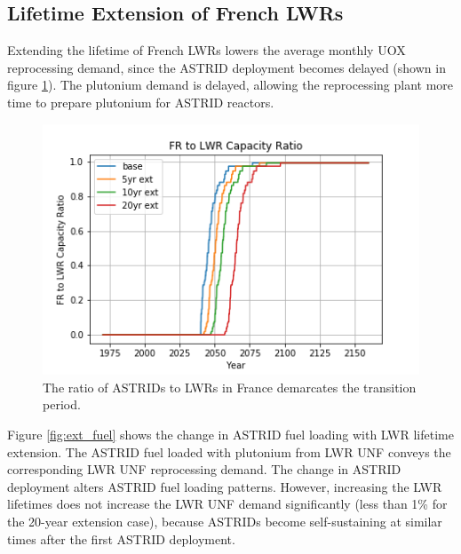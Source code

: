 \subsection{Lifetime Extension of French \glspl{LWR}}\label{sec:life}
Extending the lifetime of French \glspl{LWR} lowers the average
monthly \gls{UOX} reprocessing demand, since the \gls{ASTRID} deployment becomes 
delayed (shown in figure \ref{fig:pow_diff}). The plutonium demand is delayed,
 allowing the reprocessing plant more time to prepare plutonium for \gls{ASTRID} reactors.

\begin{figure}[htbp!]
    \begin{center}
        \includegraphics[scale=0.7]{./images/sensitivity/pow_ratio.png}
    \end{center}
    \caption{The ratio of \glspl{ASTRID} to \glspl{LWR} in France demarcates 
    the transition period.}
    \label{fig:pow_diff}
\end{figure}


Figure \ref{fig:ext_fuel} shows the change in \gls{ASTRID} fuel loading with
\gls{LWR} lifetime extension. The \gls{ASTRID} fuel loaded with plutonium
from \gls{LWR} \gls{UNF} conveys the corresponding \gls{LWR} \gls{UNF} reprocessing demand.
The change in \gls{ASTRID} deployment alters \gls{ASTRID} fuel loading patterns.
However, increasing the \gls{LWR} lifetimes
does not increase the \gls{LWR} \gls{UNF} demand significantly (less than 1\%
for the 20-year extension case),
because \glspl{ASTRID} become self-sustaining at similar times after the first
\gls{ASTRID} deployment.

